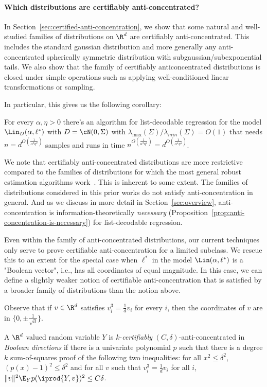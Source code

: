 \paragraph{Which distributions are certifiably anti-concentrated?} In Section~\ref{sec:certified-anti-concentration}, we show that some natural and well-studied families of distributions on $\R^d$ are certifiably anti-concentrated. This includes the standard gaussian distribution and more generally any anti-concentrated spherically symmetric distribution with subgaussian/subexponential tails. We also show that the family of certifiably anticoncentrated distributions is closed under simple operations such as applying well-conditioned linear transformations or sampling. 

In particular, this gives us the following corollary:
\begin{corollary}
For every $\alpha, \eta > 0$ there's an algorithm for list-decodable regression for the model $\Lin_D(\alpha,\ell^*)$ with $D = \cN(0,\Sigma)$ with $\lambda_{\max}(\Sigma)/\lambda_{min}(\Sigma) = O(1)$ that needs $n = d^{O(\frac{1}{\alpha^2 \eta^2})}$  samples and runs in time $n^{O(\frac{1}{\alpha^2 \eta^2})} = d^{O(\frac{1}{\alpha^4 \eta^4})}$.
\end{corollary} 

We note that certifiably anti-concentrated distributions are more restrictive compared to the families of distributions for which the most general robust estimation algorithms work~\cite{2017KS,KothariSteinhardt17,DBLP:conf/colt/KlivansKM18}. This is inherent to some extent. The families of distributions considered in this prior works do not satisfy anti-concentration in general. And as we discuss in more detail in Section~\ref{sec:overview}, anti-concentration is information-theoretically \emph{necessary} (Proposition~\ref{prop:anti-concentration-is-necessary}) for list-decodable regression. 

Even within the family of anti-concentrated distributions, our current techniques only serve to prove certifiable anti-concentration for a limited subclass. We rescue this to an extent for the special case when $\ell^*$ in the model $\Lin(\alpha,\ell^*)$ is a "Boolean vector", i.e., has all coordinates of equal magnitude. In this case, we can define a slightly weaker notion of certifiable anti-concentration that is satisfied by a broader family of distributions than the notion above. 

Observe that if $v \in \R^d$ satisfies $v_i^3 = \frac{1}{d} v_i$ for every $i$, then the coordinates of $v$ are in $\{0,\pm \frac{1}{\sqrt{d}}\}$.
\begin{definition}
A $\R^d$ valued random variable $Y$ is $k$-\emph{certifiably} $(C,\delta)$-anti-concentrated in \emph{Boolean directions} if there is a univariate polynomial $p$ such that there is a degree $k$ sum-of-squares proof of the following two inequalities: for all $x^2 \leq \delta^2$, $(p(x) - 1)^2 \leq \delta^2$ and for all $v$ such that $v_i^3 = \frac{1}{d} v_i$ for all $i$, $\|v\|^2 \E_{Y} p(\iprod{Y,v})^2 \leq C\delta$. 
\end{definition} 




